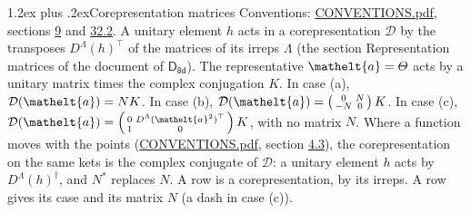 \documentclass[10pt,a4paper]{article}
\makeatletter
\renewcommand\section{\@startsection{section}{1}{\z@}{-3ex plus -1ex minus -.2ex}%
  {1.2ex plus .2ex}{\normalfont\large\sffamily\bfseries\color{parttitle}}}
\numberwithin{equation}{section}
\newcommand{\eltfont}[1]{{\let\sigma\eltsigma\mathelt{#1}}}
\newcommand{\grp}[1]{\mathsf{#1}}
\newcommand{\elt}[1]{\eltfont{#1}}
\makeatother
\begin{document}
\section{Corepresentation matrices}\label{s:corep_matrices}
Conventions: \href{../../CONVENTIONS.pdf}{CONVENTIONS.pdf}, sections \href{../../../rotation/CONVENTIONS.pdf\#conv.9}{9} and \href{../../CONVENTIONS.pdf\#conv.32.2}{32.2}.
A unitary element $h$ acts in a corepresentation $\mathcal{D}$ by the transposes $D^{\Lambda}(h)^{\top}$ of the matrices of its irreps $\Lambda$ (the section Representation matrices of the document of \href{../../../rotation/data/pdf/D8d.pdf}{$\grp{D_{8d}}$}). The representative $\elt{a} = \varTheta$ acts by a unitary matrix times the complex conjugation $K$.
In case (a), $\mathcal{D}(\elt{a}) = NK$. In case (b), $\mathcal{D}(\elt{a}) = \left(\begin{smallmatrix} 0 & N \\ -N & 0 \end{smallmatrix}\right) K$. In case (c), $\mathcal{D}(\elt{a}) = \left(\begin{smallmatrix} 0 & D^{\Lambda}(\elt{a}^2)^{\top} \\ 1 & 0 \end{smallmatrix}\right) K$, with no matrix $N$.
Where a function moves with the points (\href{../../CONVENTIONS.pdf}{CONVENTIONS.pdf}, section \href{../../../rotation/CONVENTIONS.pdf\#conv.4.3}{4.3}), the corepresentation on the same kets is the complex conjugate of $\mathcal{D}$: a unitary element $h$ acts by $D^{\Lambda}(h)^{\dagger}$, and $N^{*}$ replaces $N$.
A row is a corepresentation, by its irreps. A row gives its case and its matrix $N$ (a dash in case (c)).
\end{document}
